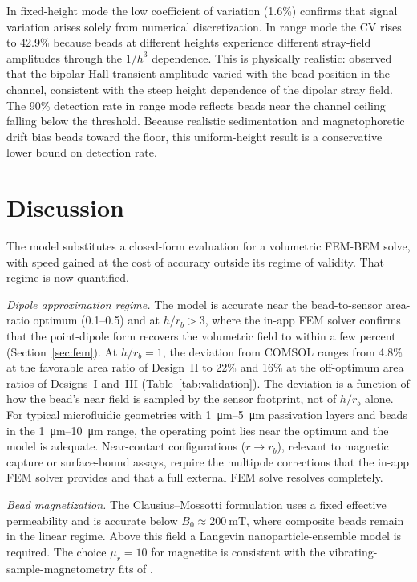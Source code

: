 \documentclass[pdflatex,sn-basic]{sn-jnl}
\theoremstyle{thmstyleone}
\theoremstyle{thmstyletwo}
\theoremstyle{thmstylethree}
\begin{document}
In fixed-height mode the low coefficient of variation (1.6\%) confirms that signal variation arises solely from numerical discretization. In range mode the CV rises to 42.9\% because beads at different heights experience different stray-field amplitudes through the $1/h^3$ dependence. This is physically realistic: \citet{aledealat2009} observed that the bipolar Hall transient amplitude varied with the bead position in the channel, consistent with the steep height dependence of the dipolar stray field. The 90\% detection rate in range mode reflects beads near the channel ceiling falling below the threshold. Because realistic sedimentation and magnetophoretic drift bias beads toward the floor, this uniform-height result is a conservative lower bound on detection rate.

\section{Discussion}\label{sec:discussion}

The model substitutes a closed-form evaluation for a volumetric FEM-BEM solve, with speed gained at the cost of accuracy outside its regime of validity. That regime is now quantified.

\textit{Dipole approximation regime.} The model is accurate near the bead-to-sensor area-ratio optimum (0.1--0.5) and at $h/r_b > 3$, where the in-app FEM solver confirms that the point-dipole form recovers the volumetric field to within a few percent (Section~\ref{sec:fem}). At $h/r_b = 1$, the deviation from COMSOL ranges from 4.8\% at the favorable area ratio of Design~II to 22\% and 16\% at the off-optimum area ratios of Designs~I and~III (Table~\ref{tab:validation}). The deviation is a function of how the bead's near field is sampled by the sensor footprint, not of $h/r_b$ alone. For typical microfluidic geometries with \SIrange{1}{5}{\micro\meter} passivation layers and beads in the \SIrange{1}{10}{\micro\meter} range, the operating point lies near the optimum and the model is adequate. Near-contact configurations ($r \to r_b$), relevant to magnetic capture or surface-bound assays, require the multipole corrections that the in-app FEM solver provides and that a full external FEM solve resolves completely.

\textit{Bead magnetization.} The Clausius--Mossotti formulation uses a fixed effective permeability and is accurate below $B_0 \approx \SI{200}{\milli\tesla}$, where composite beads remain in the linear regime. Above this field a Langevin nanoparticle-ensemble model is required. The choice $\mu_r = 10$ for magnetite is consistent with the vibrating-sample-magnetometry fits of \citet{ota2019}.
\end{document}
